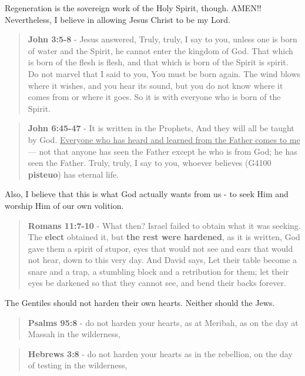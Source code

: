 \documentclass[11pt]{article}
\begin{document}
Regeneration is the sovereign work of the Holy Spirit, though. AMEN!! Nevertheless, I believe in allowing Jesus Christ to be my Lord.

\begin{quote}
\textbf{John 3:5-8} - Jesus answered, Truly, truly, I say to you, unless one is born of water and the Spirit, he cannot enter the kingdom of God. That which is born of the flesh is flesh, and that which is born of the Spirit is spirit. Do not marvel that I said to you, You must be born again. The wind blows where it wishes, and you hear its sound, but you do not know where it comes from or where it goes. So it is with everyone who is born of the Spirit.
\end{quote}

\begin{quote}
\textbf{John 6:45-47} - It is written in the Prophets, And they will all be taught by God. \uline{Everyone who has heard and learned from the Father comes to me} — not that anyone has seen the Father except he who is from God; he has seen the Father. Truly, truly, I say to you, whoever believes (G4100 \textbf{pisteuo}) has eternal life.
\end{quote}

Also, I believe that this is what God actually wants from us - to seek Him and worship Him of our own volition.

\begin{quote}
\textbf{Romans 11:7-10} - What then? Israel failed to obtain what it was seeking. The \textbf{elect} obtained it, but \textbf{the rest were hardened}, as it is written, God gave them a spirit of stupor, eyes that would not see and ears that would not hear, down to this very day.  And David says, Let their table become a snare and a trap, a stumbling block and a retribution for them; let their eyes be darkened so that they cannot see, and bend their backs forever.
\end{quote}

The Gentiles should not harden their own hearts. Neither should the Jews.

\begin{quote}
\textbf{Psalms 95:8} - do not harden your hearts, as at Meribah, as on the day at Massah in the wilderness,
\end{quote}

\begin{quote}
\textbf{Hebrews 3:8} - do not harden your hearts as in the rebellion, on the day of testing in the wilderness,
\end{quote}
\end{document}
